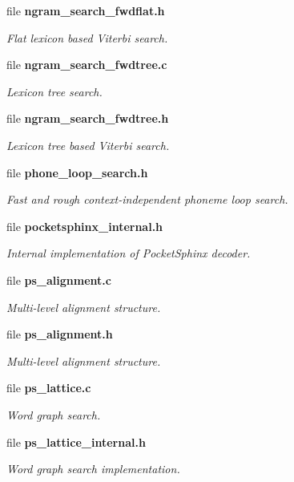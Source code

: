 \begin{DoxyCompactItemize}
file \textbf{ ngram\+\_\+search\+\_\+fwdflat.\+h}
\begin{DoxyCompactList}\small\item\em Flat lexicon based Viterbi search. \end{DoxyCompactList}\item 
file \textbf{ ngram\+\_\+search\+\_\+fwdtree.\+c}
\begin{DoxyCompactList}\small\item\em Lexicon tree search. \end{DoxyCompactList}\item 
file \textbf{ ngram\+\_\+search\+\_\+fwdtree.\+h}
\begin{DoxyCompactList}\small\item\em Lexicon tree based Viterbi search. \end{DoxyCompactList}\item 
file \textbf{ phone\+\_\+loop\+\_\+search.\+h}
\begin{DoxyCompactList}\small\item\em Fast and rough context-\/independent phoneme loop search. \end{DoxyCompactList}\item 
file \textbf{ pocketsphinx\+\_\+internal.\+h}
\begin{DoxyCompactList}\small\item\em Internal implementation of Pocket\+Sphinx decoder. \end{DoxyCompactList}\item 
file \textbf{ ps\+\_\+alignment.\+c}
\begin{DoxyCompactList}\small\item\em Multi-\/level alignment structure. \end{DoxyCompactList}\item 
file \textbf{ ps\+\_\+alignment.\+h}
\begin{DoxyCompactList}\small\item\em Multi-\/level alignment structure. \end{DoxyCompactList}\item 
file \textbf{ ps\+\_\+lattice.\+c}
\begin{DoxyCompactList}\small\item\em Word graph search. \end{DoxyCompactList}\item 
file \textbf{ ps\+\_\+lattice\+\_\+internal.\+h}
\begin{DoxyCompactList}\small\item\em Word graph search implementation. \end{DoxyCompactList}\item 

\end{DoxyCompactItemize}
